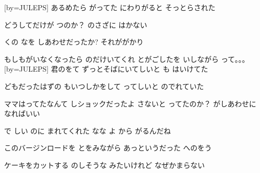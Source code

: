\documentclass{article}
\newenvironment{Japanese}{%
\CJKfamily{min}%
\CJKtilde
\CJKnospace}{}
\begin{document}
\begin{CJK}{UTF8}{}
\begin{Japanese}
\begin{songs}{}
[by={JULEPS}]
\beginverse
あるめたら
がってた
にわりがると
そっとらされた

どうしてだけが
つのか？
のさざに
はかない

くの
なを
しあわせだったか?
それががかり
 
もしもがいなくなったら
のだけいてくれ
とがごしたを
いしながら
って。。。
\endverse
\endsong
[by={JULEPS}]
\beginverse
君のをて
ずっとそばにいてしいと
も
はいけてた

どもだったはずの
もいつしかをして
ってしいと
のでれていた

ママはってたなんて
しショックだったよ
さないと
ってたのか？
がしあわせになればいい

で
しい
のに
まれてくれた
なな
よ
から
がるんだね

このバージンロードを
とをみながら
あっというだった
へのをう

ケーキをカットする
のしそうな
みたいけれど
なぜかまらない


\end{songs}
\end{Japanese}
\end{CJK}
\end{document}
